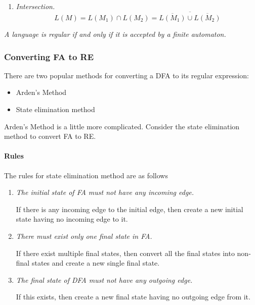\begin{multicols}{2}
\begin{enumerate}[label=(\alph*)]
  \item \textit{Intersection.}
  \begin{equation*}
    L(M) = L(M_1) \cap L(M_2) = \overline{\overline{L(M_1)} \cup \overline{L(M_2)}}
  \end{equation*}
\end{enumerate}


\begin{theorem}{}
  \textit{A language is regular if and only if it is accepted by a finite automaton.}
\end{theorem}

\subsubsection{Converting FA to RE}

There are two popular methods for converting a DFA to its regular expression:
\begin{itemize}
  \item Arden's Method
  \item State elimination method
\end{itemize}
Arden's Method is a little more complicated. Consider the state elimination method to convert FA to RE.

\paragraph{Rules}

The rules for state elimination method are as follows
\begin{enumerate}
  \item \textit{The initial state of FA must not have any incoming edge.}

    If there is any incoming edge to the initial edge, then create a new initial state having no incoming edge to it.
  
  \item \textit{There must exist only one final state in FA.}
  
    If there exist multiple final states, then convert all the final states into non-final states and create a new single final state.
  
  \item \textit{The final state of DFA must not have any outgoing edge.}
  
    If this exists, then create a new final state having no outgoing edge from it.
  

\end{enumerate}
\end{multicols}
